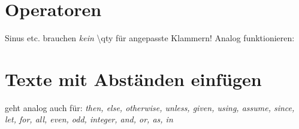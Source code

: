 \section{Operatoren}
Sinus etc. brauchen \emph{kein} \textbackslash qty für angepasste Klammern!
Analog funktionieren:

\section{Texte mit Abständen einfügen}
geht analog auch für:
\emph{then, else, otherwise, unless, given, using, assume, since, let, for, all, even, odd, integer, and, or, as, in}

